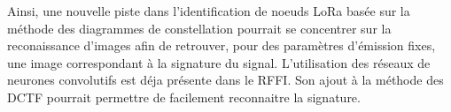 \vspace{0.1cm}

Ainsi, une nouvelle piste dans l'identification de noeuds LoRa basée sur la méthode des diagrammes de constellation pourrait se concentrer sur la reconaissance d'images afin de retrouver, pour des paramètres d'émission fixes, une image correspondant à la signature du signal. L'utilisation des réseaux de neurones convolutifs est déja présente dans le \ac{RFFI}. Son ajout à la méthode des \ac{DCTF} pourrait permettre de facilement reconnaitre la signature.